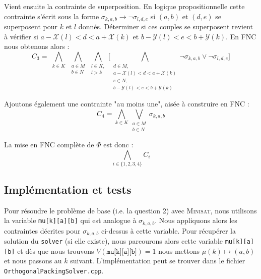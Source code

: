 \documentclass[a4paper]{article}
\begin{document}
Vient ensuite la contrainte de superposition. En logique propositionnelle cette contrainte s'écrit sous la forme $\sigma_{k,a,b} \rightarrow \lnot \sigma_{l,d,e}$ si $(a,b)$ et $(d,e)$ se superposent pour $k$ et $l$ donnés. Déterminer si ces couples se superposent revient à vérifier si $a-\mathcal{X}(l) < d < a +\mathcal{X}(k)$ et $b-\mathcal{Y}(l) < e < b +\mathcal{Y}(k)$. En FNC nous obtenons alors :
\begin{equation*}
C_3 = 	\bigwedge\limits_{\substack{k\in K}}
			\bigwedge\limits_{\substack{a \in M \\ b \in N}}
				\bigwedge\limits_{\substack{l\in K,\\ l > k}}
					\bigg[
					\bigwedge\limits_{\substack{d \in M,\\ a-\mathcal{X}(l) < d < a +\mathcal{X}(k) \\  e \in N, \\b-\mathcal{Y}(l) < e < b +\mathcal{Y}(k)}}
						\lnot \sigma_{k,a,b} \lor \lnot \sigma_{l,d,e}	
					\bigg]
\end{equation*}

Ajoutons également une contrainte "au moins une", aisée à construire en FNC : 
\begin{equation*}
	C_4 = \bigwedge\limits_{k\in K} \bigvee\limits_{\substack{a\in M \\ b \in N}} \sigma_{k,a,b}
\end{equation*}

La mise en FNC complète de $\Phi$ est donc :
\begin{equation*}
 \bigwedge\limits_{i \in \{1, 2, 3, 4\}} C_i
\end{equation*}

\subsection{Implémentation et tests}
Pour résoudre le problème de base (i.e. la question 2) avec \textsc{Minisat}, nous utilisons la variable \texttt{mu[k][a][b]} qui est analogue à $\sigma_{k,a,b}$. Nous appliquons alors les contraintes décrites pour $\sigma_{k,a,b}$ ci-dessus à cette variable. Pour récupérer la solution du \texttt{solver} (si elle existe), nous parcourons alors cette variable \texttt{mu[k][a][b]} et dès que nous trouvons $V(\texttt{mu[k][a][b]}) = 1$ nous mettons $\mu(k) \mapsto (a,b)$ et nous passons au $k$ suivant. L'implémentation peut se trouver dans le fichier \texttt{OrthogonalPackingSolver.cpp}.
\end{document}
